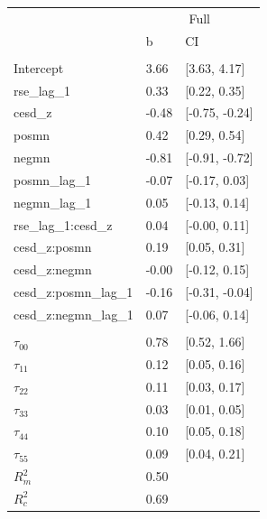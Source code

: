 \documentclass[]{article}
\begin{document}
\begin{table}[H]
\centering
\begin{tabular}{lll}
\toprule
\multicolumn{1}{c}{ } & \multicolumn{2}{c}{Full} \\
\cmidrule(l{2pt}r{2pt}){2-3}
 & b & CI\\
\midrule
\addlinespace[0.3em]
\multicolumn{3}{l}{\textbf{Fixed}}\\
\hspace{1em}Intercept & 3.66 & [3.63, 4.17]\\
\hspace{1em}rse\_lag\_1 & 0.33 & [0.22, 0.35]\\
\hspace{1em}cesd\_z & -0.48 & [-0.75, -0.24]\\
\hspace{1em}posmn & 0.42 & [0.29, 0.54]\\
\hspace{1em}negmn & -0.81 & [-0.91, -0.72]\\
\hspace{1em}posmn\_lag\_1 & -0.07 & [-0.17, 0.03]\\
\hspace{1em}negmn\_lag\_1 & 0.05 & [-0.13, 0.14]\\
\hspace{1em}rse\_lag\_1:cesd\_z & 0.04 & [-0.00, 0.11]\\
\hspace{1em}cesd\_z:posmn & 0.19 & [0.05, 0.31]\\
\hspace{1em}cesd\_z:negmn & -0.00 & [-0.12, 0.15]\\
\hspace{1em}cesd\_z:posmn\_lag\_1 & -0.16 & [-0.31, -0.04]\\
\hspace{1em}cesd\_z:negmn\_lag\_1 & 0.07 & [-0.06, 0.14]\\
\addlinespace[0.3em]
\multicolumn{3}{l}{\textbf{Random}}\\
\hspace{1em}$\tau_{00}$ & 0.78 & [0.52, 1.66]\\
\hspace{1em}$\tau_{11}$ & 0.12 & [0.05, 0.16]\\
\hspace{1em}$\tau_{22}$ & 0.11 & [0.03, 0.17]\\
\hspace{1em}$\tau_{33}$ & 0.03 & [0.01, 0.05]\\
\hspace{1em}$\tau_{44}$ & 0.10 & [0.05, 0.18]\\
\hspace{1em}$\tau_{55}$ & 0.09 & [0.04, 0.21]\\
$R^2_m$ & 0.50 & \\
$R^2_c$ & 0.69 & \\
\bottomrule
\end{tabular}
\end{table}
\end{document}
